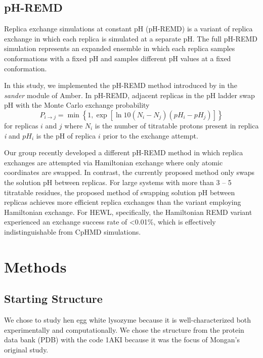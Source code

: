\subsection{pH-REMD}

Replica exchange simulations at constant pH (pH-REMD) is a variant of replica
exchange in which each replica is simulated at a separate pH. The full pH-REMD
simulation represents an expanded ensemble in which each replica samples
conformations with a fixed pH and samples different pH values at a fixed
conformation.

In this study, we implemented the pH-REMD method introduced by
\citeauthor{Itoh_Proteins_2011_v79_p3420} \cite{Itoh_Proteins_2011_v79_p3420} in
the \emph{sander} module of Amber.  \cite{AMBER12} In pH-REMD, adjacent replicas
in the pH ladder swap pH with the Monte Carlo exchange probability
\begin{equation}
   P _ {i \rightarrow j} = \min \left \lbrace 1, \exp \left[ \ln 10 \left( N _ i
            - N _ j \right) \left( pH_i - pH_j \right) \right] \right \rbrace
   \label{eq3:ExchSucc}
\end{equation}
for replicas $i$ and $j$ where $N_i$ is the number of titratable protons present
in replica \emph{i} and $pH_i$ is the pH of replica $i$ prior to the exchange
attempt.

Our group recently developed a different pH-REMD method in which replica
exchanges are attempted via Hamiltonian exchange where only atomic coordinates
are swapped. \cite{Dashti_JPhysChemB_2012_v116_p8805} In contrast, the currently
proposed method only swaps the solution pH between replicas. For large systems
with more than 3 -- 5 titratable residues, the proposed method of swapping
solution pH between replicas achieves more efficient replica exchanges than the
variant employing Hamiltonian exchange. For HEWL, specifically, the Hamiltonian
REMD variant experienced an exchange success rate of <0.01\%, which is
effectively indistinguishable from CpHMD simulations.

\section{Methods}

\subsection{Starting Structure}

We chose to study hen egg white lysozyme because it is well-characterized both
experimentally \cite{Takahashi_Biopolymers_1992_v32_p897,
Bartik_BiophysJ_1994_v66_p1180, Webb_Proteins_2011_v79_p685} and
computationally. \cite{Mongan_JComputChem_2004_v25_p2038,
Demchuk_JPhysChem_1996_v100_p17373, Wallace_JChemTheoryComput_2011_v7_p2617} We
chose the structure from the protein data bank (PDB) with the code 1AKI
\cite{Artymiuk_ActaCrystB_1982_v38_p778} because it was the focus of Mongan's
original study. \cite{Mongan_JComputChem_2004_v25_p2038}

